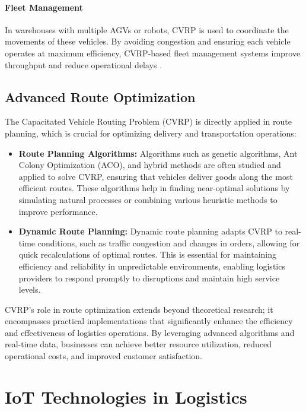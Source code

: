 \documentclass[
]{article}
\begin{document}
\paragraph{Fleet Management}
In warehouses with multiple AGVs or robots, CVRP is used to coordinate the movements of these vehicles. By avoiding congestion and ensuring each vehicle operates at maximum efficiency, CVRP-based fleet management systems improve throughput and reduce operational delays \cite{fleet_management}.

\subsection*{Advanced Route Optimization}

The Capacitated Vehicle Routing Problem (CVRP) is directly applied in route planning, which is crucial for optimizing delivery and transportation operations:

\begin{itemize}
    \item \textbf{Route Planning Algorithms:} Algorithms such as genetic algorithms, Ant Colony Optimization (ACO), and hybrid methods are often studied and applied to solve CVRP, ensuring that vehicles deliver goods along the most efficient routes. These algorithms help in finding near-optimal solutions by simulating natural processes or combining various heuristic methods to improve performance.
    \item \textbf{Dynamic Route Planning:} Dynamic route planning adapts CVRP to real-time conditions, such as traffic congestion and changes in orders, allowing for quick recalculations of optimal routes. This is essential for maintaining efficiency and reliability in unpredictable environments, enabling logistics providers to respond promptly to disruptions and maintain high service levels.
\end{itemize}

CVRP's role in route optimization extends beyond theoretical research; it encompasses practical implementations that significantly enhance the efficiency and effectiveness of logistics operations. By leveraging advanced algorithms and real-time data, businesses can achieve better resource utilization, reduced operational costs, and improved customer satisfaction.

\section{IoT Technologies in Logistics}
\end{document}
